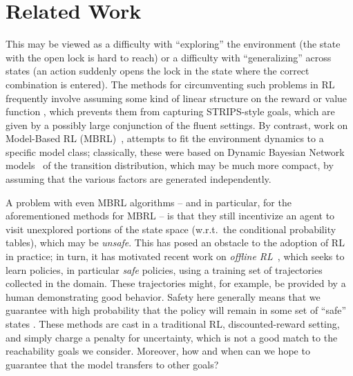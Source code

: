 \documentclass[letterpaper]{article} %
\begin{document}
\section{Related Work}




This may be viewed as a difficulty with ``exploring'' the environment (the state with the open lock is hard to reach) or a difficulty with ``generalizing'' across states (an action suddenly opens the lock in the state where the correct combination is entered). The methods for circumventing such problems in RL frequently involve assuming some kind of linear structure on the reward or value function \cite{osband2014,osband2016,jin2020,yang2019}, which prevents them from capturing STRIPS-style goals, which are given by a possibly large conjunction of the fluent settings. 
By contrast, work on Model-Based RL (MBRL)~\cite{kearns1999efficient,koller2000policy,strehl2007efficient,diuk2009adaptive}, attempts to fit the environment dynamics to a specific model class; classically, these were based on Dynamic Bayesian Network models~\cite{dean1989model} of the transition distribution, which may be much more compact, by assuming that the various factors are generated independently. 

A problem with even MBRL algorithms -- and in particular, for the aforementioned methods for MBRL -- is that they still incentivize an agent to visit unexplored portions of the state space (w.r.t.\ the conditional probability tables), which may be \emph{unsafe}. 
This has posed an obstacle to the adoption of RL in practice; in turn, it has motivated recent work on \emph{offline RL}~\cite{levine2020offline,kidambi2020morel,yu2020mopo}, which seeks to learn policies, in particular \emph{safe} policies, using a training set of trajectories collected in the domain. These trajectories might, for example, be provided by a human demonstrating good behavior. 
Safety here generally means that we guarantee with high probability that the policy will remain in some set of ``safe'' states \cite{thomas2015safe,thomas2019preventing}. These methods are cast in a traditional RL, discounted-reward setting, and simply charge a penalty for uncertainty, which is not a good match to the reachability goals we consider.
Moreover, how and when can we hope to guarantee that the model transfers to other goals? 
\end{document}

